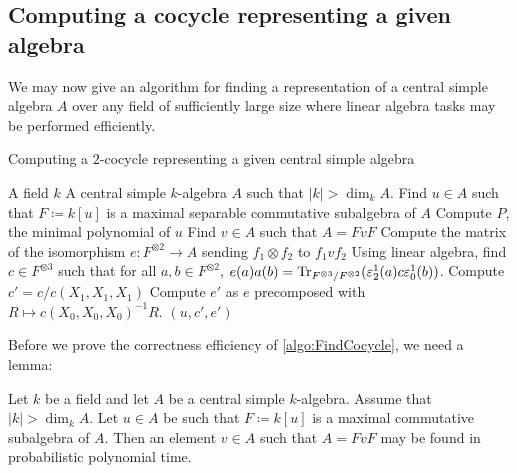 \subsection{Computing a cocycle representing a given algebra}\label{Sec:AmitsurAlgebraConstruction}

    We may now give an algorithm for finding a representation of a central simple algebra \(A\) over any field of sufficiently large size where linear algebra tasks may be performed efficiently.

    \begin{algorithm}
        \caption{Computing a \(2\)-cocycle representing a given central simple algebra}
        \label{algo:FindCocycle}
        \begin{algorithmic}[1]
            \REQUIRE A field \(k\)
            \REQUIRE A central simple \(k\)-algebra \(A\) such that \(|k| > \dim_k A\).
            \STATE Find \(u \in A\) such that \(F \coloneqq k[u]\) is a maximal separable commutative subalgebra of \(A\) \label{algoline:Findu}
            \STATE Compute \(P\), the minimal polynomial of \(u\)
            \STATE Find \(v \in A\) such that \(A = FvF\) \label{algoline:Findv}
            \STATE Compute the matrix of the isomorphism \(e: F^{\otimes 2} \to A\) sending \(f_1 \otimes f_2\) to \(f_1vf_2\)
            \STATE Using linear algebra, find \(c \in F^{\otimes 3}\) such that for all \(a,b \in F^{\otimes 2}\), \(e(a)a(b) = \operatorname{Tr}_{F^{\otimes 3}/F^{\otimes 2}}(\varepsilon_2^1(a)c\varepsilon_0^1(b))\). \label{algoline:Findc}
            \STATE Compute \(c' = c/c(X_1,X_1,X_1)\)
            \STATE Compute \(e'\) as \(e\) precomposed with \(R \mapsto c(X_0,X_0,X_0)^{-1} R\). 
            \RETURN \((u,c',e')\)
        \end{algorithmic}
    \end{algorithm}

    Before we prove the correctness efficiency of \cref{algo:FindCocycle}, we need a lemma:

    \begin{lemma}\label{lemma:Findv}
        Let \(k\) be a field and let \(A\) be a central simple \(k\)-algebra. Assume that \(|k| > \dim_k A\). Let \(u \in A\) be such that \(F \coloneqq k[u]\) is a maximal commutative subalgebra of \(A\). Then an element \(v \in A\) such that \(A = FvF\) may be found in probabilistic polynomial time.
    \end{lemma}

